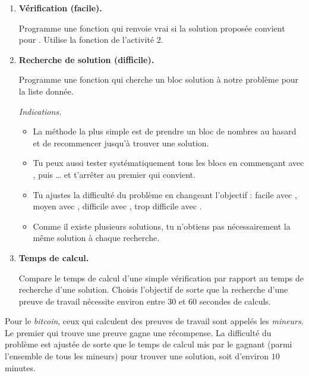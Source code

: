 \documentclass[11pt,class=report,crop=false]{standalone}
\begin{document}
\begin{activite}
\bigskip

\begin{enumerate}
  \item \textbf{Vérification (facile).} 
  
  Programme une fonction  qui renvoie vrai si la solution  proposée convient pour . Utilise la fonction  de l'activité 2.
  
  \item \textbf{Recherche de solution (difficile).}
  
  Programme une fonction  qui cherche un bloc  solution à notre problème pour la liste donnée. 
  
  
  \emph{Indications.}
  
  \begin{itemize}
    \item La méthode la plus simple est de prendre un bloc  de nombres au hasard et de recommencer jusqu'à trouver une solution.
    
    \item Tu peux aussi tester systématiquement tous les blocs en commençant avec \ci{[0,0,0,0,0,0]}, puis \ci{[0,0,0,0,0,1]}\ldots{} et t'arrêter au premier qui convient.
    
    \item Tu ajustes la difficulté du problème en changeant l'objectif : facile avec , moyen avec , difficile avec , trop difficile avec .
    
    \item Comme il existe plusieurs solutions, tu n'obtiens pas nécessairement la même solution à chaque recherche. 
    
   \end{itemize}
   
   \item \textbf{Temps de calcul.}
   
   Compare le temps de calcul d'une simple vérification par rapport au temps de recherche d'une solution. Choisis l'objectif  de sorte que la recherche d'une preuve de travail nécessite environ entre 30 et 60 secondes de calculs.
  
\end{enumerate}  

Pour le \emph{bitcoin}, ceux qui calculent des preuves de travail sont appelés les \emph{mineurs}. Le premier qui trouve une preuve gagne une récompense. La difficulté du problème est ajustée de sorte 
que le temps de calcul mis par le gagnant (parmi l'ensemble de tous les mineurs) pour trouver une solution, soit d'environ $10$ minutes.

\end{activite}
\end{document}
